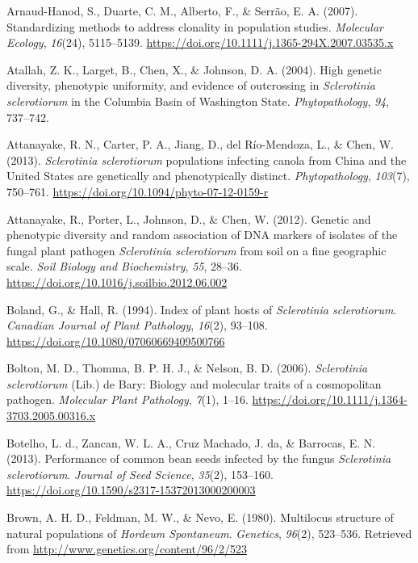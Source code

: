 \documentclass[fleqn,10pt,lineno]{wlpeerj} %
\theoremstyle{definition}
\theoremstyle{definition}
\theoremstyle{definition}
\theoremstyle{remark}
\begin{document}
\hypertarget{ref-arnaud2007standardizing}{}
Arnaud-Hanod, S., Duarte, C. M., Alberto, F., \& Serrão, E. A. (2007).
Standardizing methods to address clonality in population studies.
\emph{Molecular Ecology}, \emph{16}(24), 5115--5139.
\url{https://doi.org/10.1111/j.1365-294X.2007.03535.x}

\hypertarget{ref-atallah2004high}{}
Atallah, Z. K., Larget, B., Chen, X., \& Johnson, D. A. (2004). High
genetic diversity, phenotypic uniformity, and evidence of outcrossing in
\emph{Sclerotinia sclerotiorum} in the Columbia Basin of Washington
State. \emph{Phytopathology}, \emph{94}, 737--742.

\hypertarget{ref-attanayake2013sclerotinia}{}
Attanayake, R. N., Carter, P. A., Jiang, D., del Río-Mendoza, L., \&
Chen, W. (2013). \emph{Sclerotinia sclerotiorum} populations infecting
canola from China and the United States are genetically and
phenotypically distinct. \emph{Phytopathology}, \emph{103}(7), 750--761.
\url{https://doi.org/10.1094/phyto-07-12-0159-r}

\hypertarget{ref-attanayake2012genetic}{}
Attanayake, R., Porter, L., Johnson, D., \& Chen, W. (2012). Genetic and
phenotypic diversity and random association of DNA markers of isolates
of the fungal plant pathogen \emph{Sclerotinia sclerotiorum} from soil
on a fine geographic scale. \emph{Soil Biology and Biochemistry},
\emph{55}, 28--36. \url{https://doi.org/10.1016/j.soilbio.2012.06.002}

\hypertarget{ref-boland1994index}{}
Boland, G., \& Hall, R. (1994). Index of plant hosts of
\emph{Sclerotinia sclerotiorum}. \emph{Canadian Journal of Plant
Pathology}, \emph{16}(2), 93--108.
\url{https://doi.org/10.1080/07060669409500766}

\hypertarget{ref-bolton2006sclerotinia}{}
Bolton, M. D., Thomma, B. P. H. J., \& Nelson, B. D. (2006).
\emph{Sclerotinia sclerotiorum} (Lib.) de Bary: Biology and molecular
traits of a cosmopolitan pathogen. \emph{Molecular Plant Pathology},
\emph{7}(1), 1--16.
\url{https://doi.org/10.1111/j.1364-3703.2005.00316.x}

\hypertarget{ref-botelho2013performance}{}
Botelho, L. d., Zancan, W. L. A., Cruz Machado, J. da, \& Barrocas, E.
N. (2013). Performance of common bean seeds infected by the fungus
\emph{Sclerotinia sclerotiorum}. \emph{Journal of Seed Science},
\emph{35}(2), 153--160.
\url{https://doi.org/10.1590/s2317-15372013000200003}

\hypertarget{ref-brown1980multilocus}{}
Brown, A. H. D., Feldman, M. W., \& Nevo, E. (1980). Multilocus
structure of natural populations of \emph{Hordeum Spontaneum}.
\emph{Genetics}, \emph{96}(2), 523--536. Retrieved from
\url{http://www.genetics.org/content/96/2/523}
\end{document}
